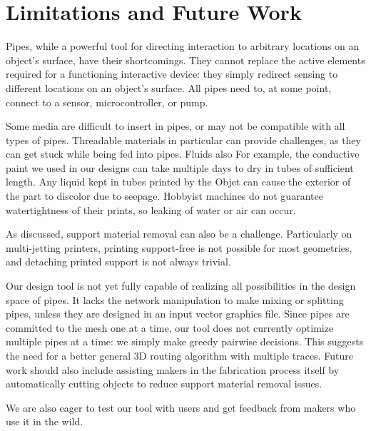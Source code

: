 \section{Limitations and Future Work}
Pipes, while a powerful tool for directing interaction to arbitrary locations on an object's surface, have their shortcomings.  They cannot replace the active elements required for a functioning interactive device: they simply redirect sensing to different locations on an object's surface.  All pipes need to, at some point, connect to a sensor, microcontroller, or pump.

Some media are difficult to insert in pipes, or may not be compatible with all types of pipes.  Threadable materials in particular can provide challenges, as they can get stuck while being fed into pipes.  Fluids also  For example, the conductive paint we used in our designs can take multiple days to dry in tubes of sufficient length.  Any liquid kept in tubes printed by the Objet can cause the exterior of the part to discolor due to seepage.  Hobbyist machines do not guarantee watertightness of their prints, so leaking of water or air can occur.

As discussed, support material removal can also be a challenge.  Particularly on multi-jetting printers, printing support-free is not possible for most geometries, and detaching printed support is not always trivial.

Our design tool is not yet fully capable of realizing all possibilities in the design space of pipes.  It lacks the network manipulation to make mixing or splitting pipes, unless they are designed in an input vector graphics file.  Since pipes are committed to the mesh one at a time, our tool does not currently optimize multiple pipes at a time: we simply make greedy pairwise decisions.  This suggests the need for a better general 3D routing algorithm with multiple traces.  Future work should also include assisting makers in the fabrication process itself by automatically cutting objects to reduce support material removal issues.  %

We are also eager to test our tool with users and get feedback from makers who use it in the wild.